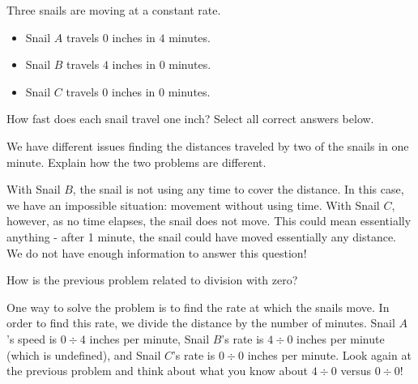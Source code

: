 \documentclass[nooutcomes]{ximera}
\begin{document}
\begin{problem}
Three snails are moving at a constant rate.

\begin{itemize}
	\item Snail $A$ travels $0$ inches in $4$ minutes.
	\item Snail $B$ travels $4$ inches in $0$ minutes.
	\item Snail $C$ travels $0$ inches in $0$ minutes.
\end{itemize}

How fast does each snail travel one inch?  Select all correct answers below.
\begin{selectAll}
\end{selectAll}

\begin{problem}
We have different issues finding the distances traveled by two of the snails in one minute.  Explain how the two problems are different.
\begin{freeResponse}
	\begin{hint}
	With Snail $B$, the snail is not using any time to cover the distance.  In this case, we have an impossible situation: movement without using time.  With Snail $C$, however, as no time elapses, the snail does not move.  This could mean essentially anything - after 1 minute, the snail could have moved essentially any distance.  We do not have enough information to answer this question!
	\end{hint}
\end{freeResponse}
\end{problem}
\end{problem}



\begin{problem}
How is the previous problem related to division with zero?
\begin{freeResponse}
	One way to solve the problem is to find the rate at which the snails move.  In order to find this rate, we divide the distance by the number of minutes.  Snail $A$'s speed is $0 \div 4$ inches per minute, Snail $B$'s rate is $4 \div 0$ inches per minute (which is undefined), and Snail $C$'s rate is $0 \div 0$ inches per minute.  Look again at the previous problem and think about what you know about $4 \div 0$ versus $0 \div 0$!
\end{freeResponse}
\end{problem}
\end{document}
